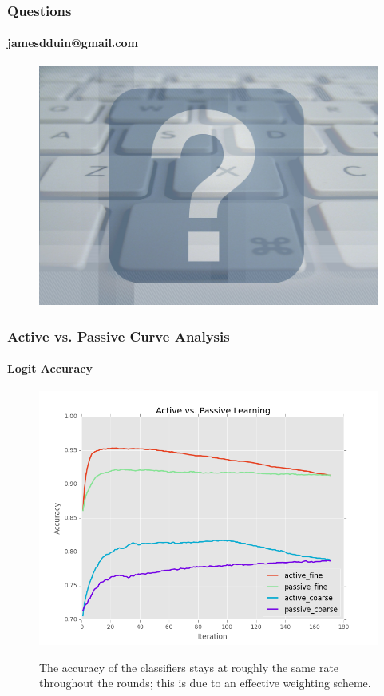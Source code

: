 \documentclass{beamer}
\begin{document}
\begin{frame}
    \frametitle{Questions}  %
    \framesubtitle{jamesdduin@gmail.com}
    \begin{figure}[!htb]
        \centering
        \includegraphics[width=1.0\columnwidth]{fig/question}
        \label{fig:question}
    \end{figure}
\end{frame}
\begin{frame}[noframenumbering]
    \frametitle{Active vs. Passive Curve Analysis}
    \framesubtitle{Logit Accuracy}
    \begin{figure}[!htb]
        \centering
        \includegraphics[width=0.80\columnwidth]{fig/runActPassLogReg_acc}
        \label{fig:runActPassLogReg_acc}
        \caption{The accuracy of the classifiers stays at
roughly the same rate throughout the rounds; this is due to an effective
weighting scheme.}
    \end{figure}
\end{frame}
\end{document}
